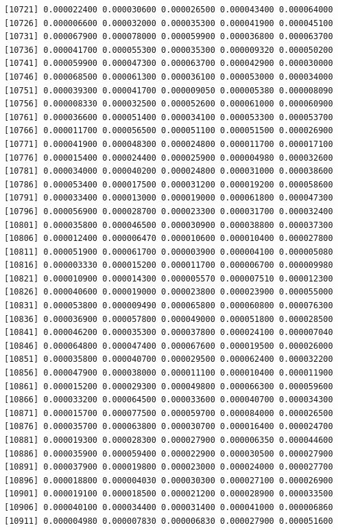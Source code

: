 \documentclass[]{article}
\begin{document}
\begin{verbatim}
[10721] 0.000022400 0.000030600 0.000026500 0.000043400 0.000064000
[10726] 0.000006600 0.000032000 0.000035300 0.000041900 0.000045100
[10731] 0.000067900 0.000078000 0.000059900 0.000036800 0.000063700
[10736] 0.000041700 0.000055300 0.000035300 0.000009320 0.000050200
[10741] 0.000059900 0.000047300 0.000063700 0.000042900 0.000030000
[10746] 0.000068500 0.000061300 0.000036100 0.000053000 0.000034000
[10751] 0.000039300 0.000041700 0.000009050 0.000005380 0.000008090
[10756] 0.000008330 0.000032500 0.000052600 0.000061000 0.000060900
[10761] 0.000036600 0.000051400 0.000034100 0.000053300 0.000053700
[10766] 0.000011700 0.000056500 0.000051100 0.000051500 0.000026900
[10771] 0.000041900 0.000048300 0.000024800 0.000011700 0.000017100
[10776] 0.000015400 0.000024400 0.000025900 0.000004980 0.000032600
[10781] 0.000034000 0.000040200 0.000024800 0.000031000 0.000038600
[10786] 0.000053400 0.000017500 0.000031200 0.000019200 0.000058600
[10791] 0.000033400 0.000013000 0.000019000 0.000061800 0.000047300
[10796] 0.000056900 0.000028700 0.000023300 0.000031700 0.000032400
[10801] 0.000035800 0.000046500 0.000030900 0.000038800 0.000037300
[10806] 0.000012400 0.000006470 0.000010600 0.000010400 0.000027800
[10811] 0.000051900 0.000061700 0.000003900 0.000004100 0.000005080
[10816] 0.000003330 0.000015200 0.000011700 0.000006700 0.000009980
[10821] 0.000010900 0.000014300 0.000005570 0.000007510 0.000012300
[10826] 0.000040600 0.000019000 0.000023800 0.000023900 0.000055000
[10831] 0.000053800 0.000009490 0.000065800 0.000060800 0.000076300
[10836] 0.000036900 0.000057800 0.000049000 0.000051800 0.000028500
[10841] 0.000046200 0.000035300 0.000037800 0.000024100 0.000007040
[10846] 0.000064800 0.000047400 0.000067600 0.000019500 0.000026000
[10851] 0.000035800 0.000040700 0.000029500 0.000062400 0.000032200
[10856] 0.000047900 0.000038000 0.000011100 0.000010400 0.000011900
[10861] 0.000015200 0.000029300 0.000049800 0.000066300 0.000059600
[10866] 0.000033200 0.000064500 0.000033600 0.000040700 0.000034300
[10871] 0.000015700 0.000077500 0.000059700 0.000084000 0.000026500
[10876] 0.000035700 0.000063800 0.000030700 0.000016400 0.000024700
[10881] 0.000019300 0.000028300 0.000027900 0.000006350 0.000044600
[10886] 0.000035900 0.000059400 0.000022900 0.000030500 0.000027900
[10891] 0.000037900 0.000019800 0.000023000 0.000024000 0.000027700
[10896] 0.000018800 0.000004030 0.000030300 0.000027100 0.000026900
[10901] 0.000019100 0.000018500 0.000021200 0.000028900 0.000033500
[10906] 0.000040100 0.000034400 0.000031400 0.000041000 0.000006860
[10911] 0.000004980 0.000007830 0.000006830 0.000027900 0.000051600

\end{verbatim}
\end{document}
